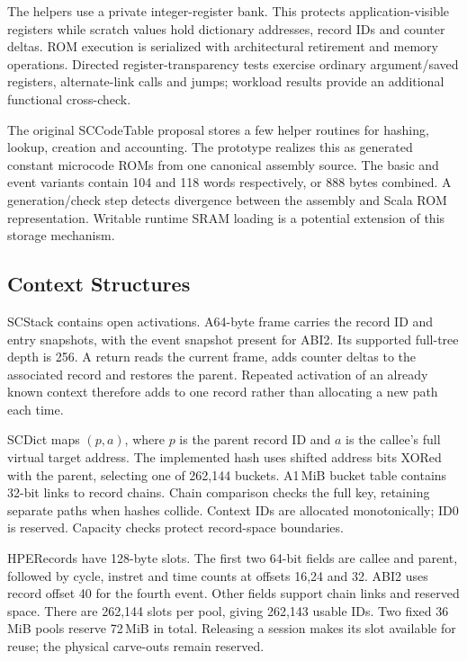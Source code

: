 The helpers use a private integer-register bank. This protects application-visible registers while scratch values hold dictionary addresses, record IDs and counter deltas. ROM execution is serialized with architectural retirement and memory operations. Directed register-transparency tests exercise ordinary argument/saved registers, alternate-link calls and jumps; workload results provide an additional functional cross-check.

The original SCCodeTable proposal stores a few helper routines for hashing, lookup, creation and accounting. The prototype realizes this as generated constant microcode ROMs from one canonical assembly source. The basic and event variants contain 104 and 118 words respectively, or 888 bytes combined. A generation/check step detects divergence between the assembly and Scala ROM representation. Writable runtime SRAM loading is a potential extension of this storage mechanism.

\subsection{Context Structures}
SCStack contains open activations. A64-byte frame carries the record ID and entry snapshots, with the event snapshot present for ABI2. Its supported full-tree depth is 256. A return reads the current frame, adds counter deltas to the associated record and restores the parent. Repeated activation of an already known context therefore adds to one record rather than allocating a new path each time.

SCDict maps $(p,a)$, where $p$ is the parent record ID and $a$ is the callee's full virtual target address. The implemented hash uses shifted address bits XORed with the parent, selecting one of 262,144 buckets. A1\,MiB bucket table contains 32-bit links to record chains. Chain comparison checks the full key, retaining separate paths when hashes collide. Context IDs are allocated monotonically; ID0 is reserved. Capacity checks protect record-space boundaries.

HPERecords have 128-byte slots. The first two 64-bit fields are callee and parent, followed by cycle, instret and time counts at offsets 16,24 and 32. ABI2 uses record offset 40 for the fourth event. Other fields support chain links and reserved space. There are 262,144 slots per pool, giving 262,143 usable IDs. Two fixed 36\,MiB pools reserve 72\,MiB in total. Releasing a session makes its slot available for reuse; the physical carve-outs remain reserved.

